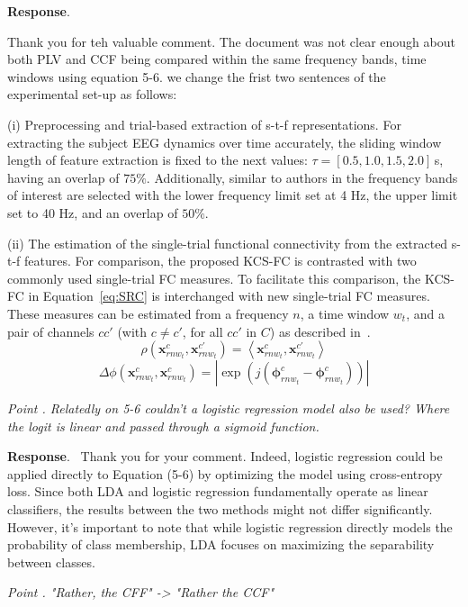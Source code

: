 \documentclass[runningheads]{llncs}
\newcommand{\ve}[1]{\bm {#1}}
\newenvironment{reviewer}{\setcounter{pointcounter}{1}}{}
\newcommand{\changes}[1]{\textcolor[rgb]{1.00,0.00,0.00}{#1}}
\newcommand{\point}[1]{\medskip \noindent
 \textsl{{\fontseries{b}\selectfont Point \thepointcounter}.
 \stepcounter{pointcounter} #1}}
\newcommand{\reply}{\medskip \noindent \textbf{Response}.\ }
\begin{document}
\begin{reviewer}
\reply{
    Thank you for teh valuable comment. The document was not clear enough about both PLV and CCF being compared within the same frequency bands, time windows using equation 5-6. we change the frist two sentences of the experimental set-up as follows:

    \changes{
({i}) Preprocessing and trial-based extraction of {s-t-f} representations. For extracting the subject EEG dynamics over time accurately, the sliding window length of feature extraction is fixed to the next values: $\tau=[0.5,1.0,1.5,2.0]$\,{s}, having an overlap of $75\%$. Additionally, similar to authors in \cite{ang2008filter} the frequency bands of interest are selected with the lower frequency limit set at 4 Hz, the upper limit set to 40 Hz, and an overlap of $50\%$.
}

\changes{
({ii}) The estimation of the single-trial functional connectivity from the extracted {s-t-f} features. For comparison, the proposed KCS-FC is contrasted with two commonly used single-trial FC measures. To facilitate this comparison, the KCS-FC in Equation~\eqref{eq:SRC} is interchanged with new single-trial FC measures. These measures can be estimated from a frequency $n$, a time window $w_t$, and a pair of channels ${cc'}$ (with $c \neq c'$, for all $cc'$ in $C$) as described in~\cite{rodrigue2019}.
\begin{equation}
			\rho(\ve{x}^{c}_{rnw_t},\ve{x}^{c'}_{rnw_t}) ={\left<\ve{x}^{c}_{rnw_t},\ve{x}^{c'}_{rnw_t}\right>}\label{Eq:Pearson}
\end{equation}
\begin{equation}		 
	{\Delta\phi(\ve{x}^{c}_{rnw_t},\ve{x}^{c}_{rnw_t})}  {= {|\exp(j(\ve{\phi}_{rnw_t}^{c}-\ve{\phi}_{rnw_t}^{c}))|}} \label{Eq:PLV} 
\end{equation}
}
}

\point{Relatedly on 5-6 couldn't a logistic regression model also be used? Where the logit is linear and passed through a sigmoid function. }

\reply{
    Thank you for your comment. Indeed, logistic regression could be applied directly to Equation (5-6) by optimizing the model using cross-entropy loss. Since both LDA and logistic regression fundamentally operate as linear classifiers, the results between the two methods might not differ significantly. However, it's important to note that while logistic regression directly models the probability of class membership, LDA focuses on maximizing the separability between classes.
}

\point{"Rather, the CFF" -> "Rather the CCF"}


\end{reviewer}
\end{document}
